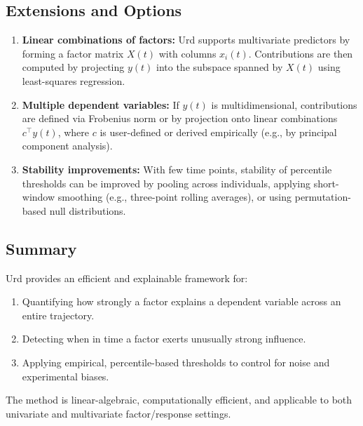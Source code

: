 \documentclass{article}
\begin{document}
\subsection{Extensions and Options}

\begin{enumerate}
    \item \textbf{Linear combinations of factors:} Urd supports multivariate predictors by forming a factor matrix $X(t)$ with columns $x_i(t)$. Contributions are then computed by projecting $y(t)$ into the subspace spanned by $X(t)$ using least-squares regression.
    \item \textbf{Multiple dependent variables:} If $y(t)$ is multidimensional, contributions are defined via Frobenius norm or by projection onto linear combinations $c^\top y(t)$, where $c$ is user-defined or derived empirically (e.g., by principal component analysis).
    \item \textbf{Stability improvements:} With few time points, stability of percentile thresholds can be improved by pooling across individuals, applying short-window smoothing (e.g., three-point rolling averages), or using permutation-based null distributions.
\end{enumerate}

\subsection{Summary}

Urd provides an efficient and explainable framework for:
\begin{enumerate}
    \item Quantifying how strongly a factor explains a dependent variable across an entire trajectory.
    \item Detecting when in time a factor exerts unusually strong influence.
    \item Applying empirical, percentile-based thresholds to control for noise and experimental biases.
\end{enumerate}
The method is linear-algebraic, computationally efficient, and applicable to both univariate and multivariate factor/response settings.
\end{document}
